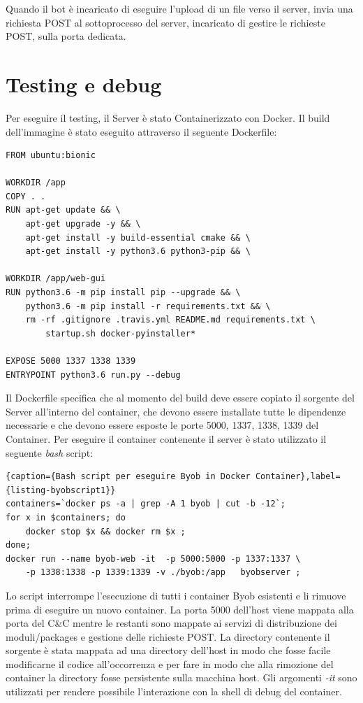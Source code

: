 Quando il bot è incaricato di eseguire l'upload di un file verso il server, invia una richiesta POST al sottoprocesso del server, incaricato di gestire le richieste POST, sulla porta dedicata.

\section{Testing e debug}
Per eseguire il testing, il Server è stato Containerizzato con Docker.
Il build dell'immagine è stato eseguito attraverso il seguente Dockerfile:
\lstset{  basicstyle=\footnotesize,
frame=single}
\begin{lstlisting}[caption={Byob Server Dockerfile},label={listing-byobdocker},frame=single]
FROM ubuntu:bionic

WORKDIR /app
COPY . .
RUN apt-get update && \
    apt-get upgrade -y && \
    apt-get install -y build-essential cmake && \
    apt-get install -y python3.6 python3-pip && \

WORKDIR /app/web-gui
RUN python3.6 -m pip install pip --upgrade && \
    python3.6 -m pip install -r requirements.txt && \
    rm -rf .gitignore .travis.yml README.md requirements.txt \
        startup.sh docker-pyinstaller*

EXPOSE 5000 1337 1338 1339
ENTRYPOINT python3.6 run.py --debug
\end{lstlisting}
Il Dockerfile specifica che al momento del build deve essere copiato il sorgente del Server all'interno del container, che devono essere installate tutte le dipendenze necessarie e che devono essere esposte le porte 5000, 1337, 1338, 1339 del Container.
Per eseguire  il container contenente il server è stato utilizzato  il seguente \textit{bash} script:
\begin{lstlisting}{caption={Bash script per eseguire Byob in Docker Container},label={listing-byobscript1}}
containers=`docker ps -a | grep -A 1 byob | cut -b -12`;
for x in $containers; do 
    docker stop $x && docker rm $x ;
done;
docker run --name byob-web -it  -p 5000:5000 -p 1337:1337 \
    -p 1338:1338 -p 1339:1339 -v ./byob:/app   byobserver ;
\end{lstlisting}
Lo script interrompe l'esecuzione di tutti i container Byob esistenti e li rimuove prima di eseguire un nuovo container. La porta 5000 dell'host viene mappata alla porta del C\&C  mentre le restanti sono mappate ai servizi di distribuzione dei moduli/packages e    gestione delle richieste POST. La directory contenente il sorgente è stata mappata ad una directory dell'host in modo che fosse facile modificarne il codice all'occorrenza e per fare in modo che alla rimozione del container la directory fosse persistente sulla macchina host. Gli argomenti \textit{-it} sono utilizzati per rendere possibile l'interazione con la shell di debug del container.

